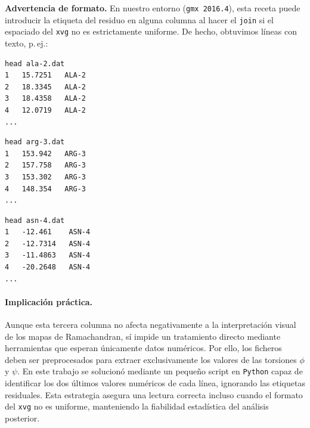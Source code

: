 \documentclass[12pt,a4paper]{article}
\begin{document}
\noindent
\textbf{Advertencia de formato.} En nuestro entorno (\texttt{gmx 2016.4}), esta receta puede introducir la etiqueta del residuo en alguna columna al hacer el \texttt{join} si el espaciado del \texttt{xvg} no es estrictamente uniforme. De hecho, obtuvimos líneas con texto, p.\,ej.:

\begin{verbatim}
head ala-2.dat
1   15.7251   ALA-2
2   18.3345   ALA-2
3   18.4358   ALA-2
4   12.0719   ALA-2
...
\end{verbatim}

\begin{verbatim}
head arg-3.dat
1   153.942   ARG-3
2   157.758   ARG-3
3   153.302   ARG-3
4   148.354   ARG-3
...
\end{verbatim}

\begin{verbatim}
head asn-4.dat
1   -12.461    ASN-4
2   -12.7314   ASN-4
3   -11.4863   ASN-4
4   -20.2648   ASN-4
...
\end{verbatim}

\paragraph{Implicación práctica.}
Aunque esta tercera columna no afecta negativamente a la interpretación visual de los mapas de Ramachandran, sí impide un tratamiento directo mediante herramientas que esperan únicamente datos numéricos. Por ello, los ficheros deben ser preprocesados para extraer exclusivamente los valores de las torsiones $\phi$ y $\psi$. En este trabajo se solucionó mediante un pequeño script en \texttt{Python} capaz de identificar los dos últimos valores numéricos de cada línea, ignorando las etiquetas residuales. Esta estrategia asegura una lectura correcta incluso cuando el formato del \texttt{xvg} no es uniforme, manteniendo la fiabilidad estadística del análisis posterior.

\end{document}
